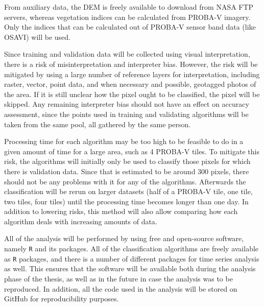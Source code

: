 \documentclass[a4paper,10pt]{article}
\begin{document}
From auxiliary data, the DEM is freely available to download from NASA FTP servers, whereas vegetation indices can be calculated from PROBA-V imagery. Only the indices that can be calculated out of PROBA-V sensor band data (like OSAVI) will be used.

Since training and validation data will be collected using visual interpretation, there is a risk of misinterpretation and interpreter bias. However, the risk will be mitigated by using a large number of reference layers for interpretation, including raster, vector, point data, and when necessary and possible, geotagged photos of the area. If it is still unclear how the pixel ought to be classified, the pixel will be skipped. Any remaining interpreter bias should not have an effect on accuracy assessment, since the points used in training and validating algorithms will be taken from the same pool, all gathered by the same person.

Processing time for each algorithm may be too high to be feasible to do in a given amount of time for a large area, such as 4 PROBA-V tiles. To mitigate this risk, the algorithms will initially only be used to classify those pixels for which there is validation data. Since that is estimated to be around 300 pixels, there should not be any problems with it for any of the algorithms. Afterwards the classification will be rerun on larger datasets (half of a PROBA-V tile, one tile, two tiles, four tiles) until the processing time becomes longer than one day. In addition to lowering risks, this method will also allow comparing how each algorithm deals with increasing amounts of data.

All of the analysis will be performed by using free and open-source software, namely \texttt{R} and its packages. All of the classification algorithms are freely available as \texttt{R} packages, and there is a number of different packages for time series analysis as well. This ensures that the software will be available both during the analysis phase of the thesis, as well as in the future in case the analysis was to be reproduced. In addition, all the code used in the analysis will be stored on GitHub for reproducibility purposes.


\end{document}
